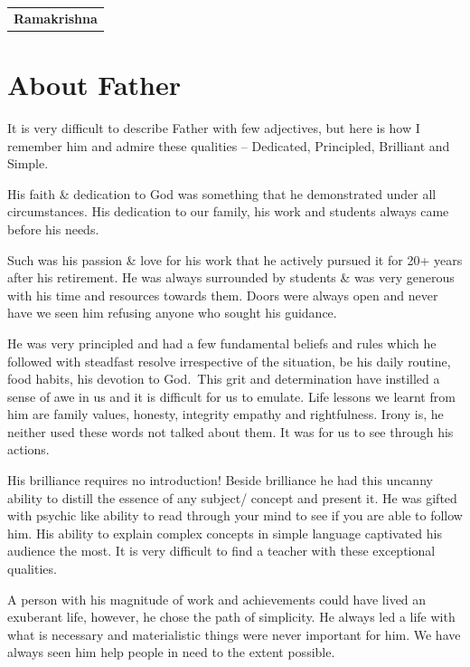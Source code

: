 \begin{flushright}
\begin{tabular}{c}
\textbf{Ramakrishna}
\end{tabular}
\end{flushright}
\bigskip

\section*{About Father}

It is very difficult to describe Father with few adjectives, but here is how I remember him and admire these qualities -- Dedicated, Principled, Brilliant and Simple.

His faith \& dedication to God was something that he demonstrated under all circumstances. His dedication to our family, his work and students always came before his needs.

Such was his passion \& love for his work that he actively pursued it for 20+ years after his retirement. He was always surrounded by students \& was very generous with his time and resources towards them. Doors were always open and never have we seen him refusing anyone who sought his guidance.

He was very principled and had a few fundamental beliefs and rules which he followed with steadfast resolve irrespective of the situation, be his daily routine, food habits, his devotion to God. This grit and determination have instilled a sense of awe in us and it is difficult for us to emulate. Life lessons we learnt from him are family values, honesty, integrity empathy and rightfulness. Irony is, he neither used these words not talked about them. It was for us to see through his actions.  

His brilliance requires no introduction! Beside brilliance he had this uncanny ability to distill the essence of any subject/ concept and present it. He was gifted with psychic like ability to read through your mind to see if you are able to follow him. His ability to explain complex concepts in simple language captivated his audience the most. It is very difficult to find a teacher with these exceptional qualities. 

A person with his magnitude of work and achievements could have lived an exuberant life, however, he chose the path of simplicity. He always led a life with what is necessary and materialistic things were never important for him. We have always seen him help people in need to the extent possible. 


